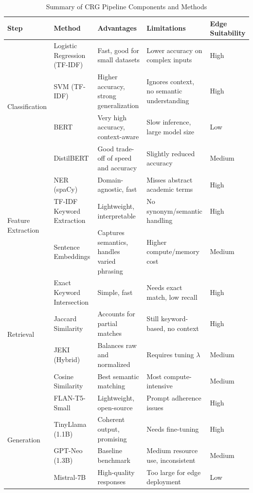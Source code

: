 \documentclass[conference]{IEEEtran}
\begin{document}
\begin{table}[t]
    \centering
    \caption{Summary of CRG Pipeline Components and Methods}
    \label{tab:crg_summary}
    \begin{tabular}{p{2.1cm} p{3.5cm} p{4.0cm} p{4.0cm} p{2.1cm}}
        \toprule
        \textbf{Step} & \textbf{Method} & \textbf{Advantages} & \textbf{Limitations} & \textbf{Edge Suitability} \\
        \midrule
        \multirow{4}{*}{Classification} 
        & Logistic Regression (TF-IDF) & Fast, good for small datasets & Lower accuracy on complex inputs & High \\
        & SVM (TF-IDF) & Higher accuracy, strong generalization & Ignores context, no semantic understanding & High \\
        & BERT & Very high accuracy, context-aware & Slow inference, large model size & Low \\
        & DistilBERT & Good trade-off of speed and accuracy & Slightly reduced accuracy & Medium \\
        \midrule
        \multirow{3}{*}{Feature Extraction}
        & NER (spaCy) & Domain-agnostic, fast & Misses abstract academic terms & High \\
        & TF-IDF Keyword Extraction & Lightweight, interpretable & No synonym/semantic handling & High \\
        & Sentence Embeddings & Captures semantics, handles varied phrasing & Higher compute/memory cost & Medium \\
        \midrule
        \multirow{4}{*}{Retrieval}
        & Exact Keyword Intersection & Simple, fast & Needs exact match, low recall & High \\
        & Jaccard Similarity & Accounts for partial matches & Still keyword-based, no context & High \\
        & JEKI (Hybrid) & Balances raw and normalized & Requires tuning $\lambda$ & Medium \\
        & Cosine Similarity & Best semantic matching & Most compute-intensive & Medium \\
        \midrule
        \multirow{4}{*}{Generation}
        & FLAN-T5-Small & Lightweight, open-source & Prompt adherence issues & High \\
        & TinyLlama (1.1B) & Coherent output, promising & Needs fine-tuning & High \\
        & GPT-Neo (1.3B) & Baseline benchmark & Medium resource use, inconsistent & Medium \\
        & Mistral-7B & High-quality responses & Too large for edge deployment & Low \\
        \bottomrule
    \end{tabular}
\end{table}
\end{document}
